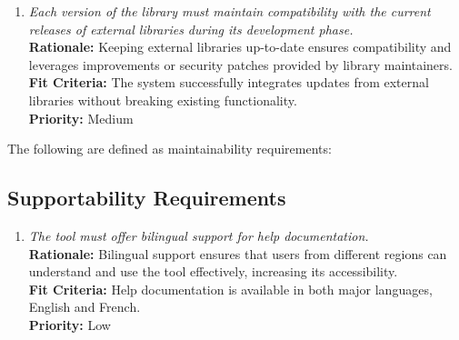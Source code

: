 \documentclass[12pt]{article}
\begin{document}
\begin{enumerate}[label=MS-MNT \arabic*., wide=0pt, leftmargin=*]
  \item \emph{Each version of the library must maintain compatibility
      with the current releases of external libraries during its
    development phase.}\\
    {\bf Rationale:} Keeping external libraries up-to-date ensures
    compatibility and leverages improvements or security patches
    provided by library maintainers.\\
    {\bf Fit Criteria:} The system successfully integrates updates
    from external libraries without breaking existing functionality.\\
    {\bf Priority:} Medium

\end{enumerate}

The following are defined as maintainability requirements:
\subsection{Supportability Requirements}
\begin{enumerate}[label=MS-SP \arabic*., wide=0pt, leftmargin=*]
  \item \emph{The tool must offer bilingual support for help documentation.}\\
    {\bf Rationale:} Bilingual support ensures that users from
    different regions can understand and use the tool effectively,
    increasing its accessibility.\\
    {\bf Fit Criteria:} Help documentation is available in both major
    languages, English and French.\\
    {\bf Priority:} Low
\end{enumerate}
\end{document}
